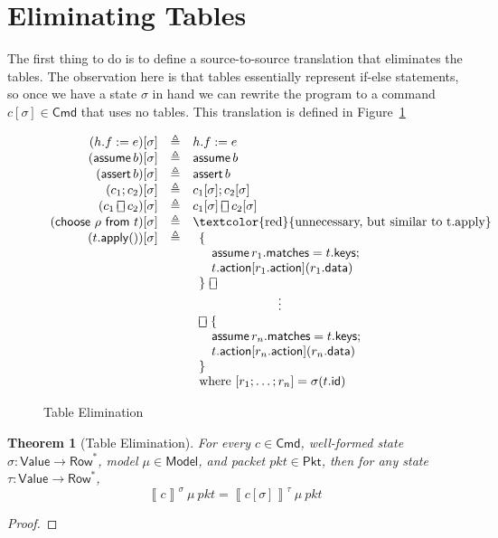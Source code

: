 \documentclass{article}
\newcommand{\pkt}{\mathit{pkt}}
\newcommand{\denote}[1]{\left\llbracket#1\right\rrbracket}
\newcommand{\Value}{\mathsf{Value}}
\newcommand{\Cmd}{\mathsf{Cmd}}
\newcommand{\Pkt}{\mathsf{Pkt}}
\newcommand{\Model}{\mathsf{Model}}
\newcommand{\Row}{\mathsf{Row}}
\newcommand{\matches}{\mathsf{matches}}
\newcommand{\action}{\mathsf{action}}
\newcommand{\keys}{\mathsf{keys}}
\newcommand{\data}{\mathsf{data}}
\newcommand{\id}{\mathsf{id}}
\newcommand{\assert}{\mathop{\mathsf{assert}}}
\newcommand{\assume}{\mathop{\mathsf{assume}}}
\newcommand{\apply}{\mathsf{apply}}
\newcommand{\choiceop}{\rotatebox[origin=c]{90}{$\sqsubset\!\!\!\sqsupset$}}
\newcommand{\choice}{\mathbin{\choiceop}}
\renewcommand{\choose}[2]{\mathsf{choose}~#1~\mathsf{from}~#2}
\newtheorem{theorem}{Theorem}
\begin{document}
\section{Eliminating Tables}

The first thing to do is to define a source-to-source translation that
eliminates the tables. The observation here is that tables essentially represent
if-else statements, so once we have a state $\sigma$ in hand we can rewrite the
program to a command $c[\sigma] \in \Cmd$ that uses no tables. This translation
is defined in Figure~\ref{fig:table-elim}

\begin{figure}
  \[\begin{array}{r>{\triangleq}cl}
  (h.f := e)[\sigma] && h.f := e   \\
  (\assume b)[\sigma] && \assume b \\
  (\assert b)[\sigma] && \assert b \\
  (c_1;c_2)[\sigma] && c_1[\sigma];c_2[\sigma] \\
  (c_1 \choice c_2)[\sigma] && c_1[\sigma] \choice c_2[\sigma] \\
  (\choose \rho t)[\sigma] && \textrm{\textcolor{red}{unnecessary, but similar to t.apply}}\\
  (t.\apply())[\sigma] &&
  \begin{array}[t]{l}
    \{\\
    \quad \assume {r_1.\matches = t.\keys};\\
    \quad t.\action[r_1.\action](r_1.\data)\\
    \}~\choice\\
    \multicolumn{1}{c}{\vdots}\\
    \choice~\{\\
    \quad \assume {r_n.\matches = t.\keys};\\
    \quad t.\action[r_n.\action](r_n.\data)\\
    \}\\
    \textrm{where}~[r_1;\ldots;r_n] = \sigma(t.\id)
  \end{array}
  \end{array}
  \]
  \caption{Table Elimination}
  \label{fig:table-elim}
\end{figure}


\begin{theorem}[Table Elimination]
  For every $c \in \Cmd$, well-formed state $\sigma : \Value \to \Row^*$, model
  $\mu \in \Model$, and packet $\pkt \in \Pkt$, then for any state $\tau :
  \Value \to \Row^*$,
  \[\denote{c}^\sigma~\mu~\pkt = \denote{c[\sigma]}^\tau~\mu~\pkt\]
\end{theorem}
\begin{proof}
\end{proof}
\end{document}
